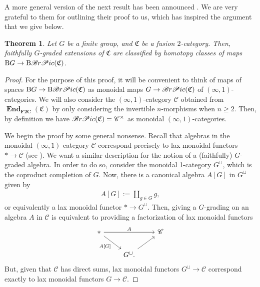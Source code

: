\documentclass[11pt]{article}
\numberwithin{equation}{section}
\newtheorem{Theorem}{Theorem}[section]
\numberwithin{equation}{section}
\begin{document}
\setcounter{Theorem}{10}
A more general version of the next result has been announced \cite{JFR3}. We are very grateful to them for outlining their proof to us, which has inspired the argument that we give below.

\begin{Theorem}\label{thm:extensiontheory}
Let $G$ be a finite group, and $\mathfrak{C}$ be a fusion $2$-category. Then, faithfully $G$-graded extensions of $\mathfrak{C}$ are classified by homotopy classes of maps $\mathrm{B}G\rightarrow \mathrm{B}\mathscr{B}{\rm r}\mathscr{P}{\rm ic}(\mathfrak{C})$.
\end{Theorem}
\begin{proof}
For the purpose of this proof, it will be convenient to think of maps of spaces $\mathrm{B}G\rightarrow \mathrm{B}\mathscr{B}{\rm r}\mathscr{P}{\rm ic}(\mathfrak{C})$ as monoidal maps $G\rightarrow \mathscr{B}{\rm r}\mathscr{P}{\rm ic}(\mathfrak{C})$ of $(\infty,1)$-categories. We will also consider the $(\infty,1)$-category $\mathscr{C}$ obtained from $\mathbf{\operatorname{End}}_{\mathbf{F2C}}(\mathfrak{C})$ by only considering the invertible $n$-morphisms when $n\geq 2$. Then, by definition we have $\mathscr{B}{\rm r}\mathscr{P}{\rm ic}(\mathfrak{C})=\mathscr{C}^{\times}$ as monoidal $(\infty,1)$-categories.

We begin the proof by some general nonsense. Recall that algebras in the monoidal $(\infty,1)$-category $\mathscr{C}$ correspond precisely to lax monoidal functors $*\rightarrow \mathscr{C}$ (see \cite[Example~2.2.6.10]{L2}). We want a similar description for the notion of a (faithfully) $G$-graded algebra. In order to do so, consider the monoidal 1-category $G^{\sqcup}$, which is the coproduct completion of $G$. Now, there is a canonical algebra $A[G]$ in $G^{\sqcup}$ given by
 \begin{gather*}
A[G]:=\coprod_{g\in G}g,
\end{gather*}
 or equivalently a lax monoidal functor $*\rightarrow G^{\sqcup}$. Then, giving a $G$-grading on an algebra $A$ in $\mathscr{C}$ is equivalent to providing a factorization of lax monoidal functors
\begin{displaymath}
\begin{tikzcd}
* \arrow[rr,"A"] \arrow[rd, "A\lbrack G \rbrack"'] & & \mathscr{C} \\
 & G^{\sqcup}. \arrow[ru] &
\end{tikzcd}\end{displaymath}
But, given that $\mathscr{C}$ has direct sums, lax monoidal functors $G^{\sqcup}\rightarrow \mathscr{C}$ correspond exactly to lax monoidal functors $G\rightarrow \mathscr{C}$.


\end{proof}
\end{document}
